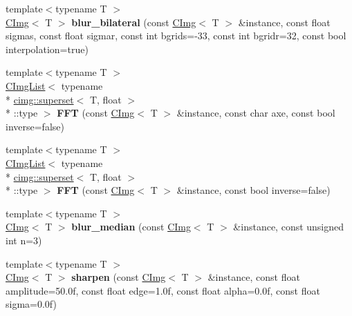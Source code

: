 \begin{DoxyCompactItemize}
\item 
\hypertarget{namespacecimg__library_a8e9e88613a50a5f8750eae25c4cb3ec2}{{\footnotesize template$<$typename T $>$ }\\\hyperlink{structcimg__library_1_1_c_img}{C\-Img}$<$ T $>$ {\bfseries blur\-\_\-bilateral} (const \hyperlink{structcimg__library_1_1_c_img}{C\-Img}$<$ T $>$ \&instance, const float sigmas, const float sigmar, const int bgrids=-\/33, const int bgridr=32, const bool interpolation=true)}\label{namespacecimg__library_a8e9e88613a50a5f8750eae25c4cb3ec2}

\item 
\hypertarget{namespacecimg__library_a1beefe187cc1e13f9b222b75ed6b1325}{{\footnotesize template$<$typename T $>$ }\\\hyperlink{structcimg__library_1_1_c_img_list}{C\-Img\-List}$<$ typename \\*
\hyperlink{structcimg__library_1_1cimg_1_1superset}{cimg\-::superset}$<$ T, float $>$\\*
\-::type $>$ {\bfseries F\-F\-T} (const \hyperlink{structcimg__library_1_1_c_img}{C\-Img}$<$ T $>$ \&instance, const char axe, const bool inverse=false)}\label{namespacecimg__library_a1beefe187cc1e13f9b222b75ed6b1325}

\item 
\hypertarget{namespacecimg__library_afba31aad9e0b94e3feaa49108a6f87c0}{{\footnotesize template$<$typename T $>$ }\\\hyperlink{structcimg__library_1_1_c_img_list}{C\-Img\-List}$<$ typename \\*
\hyperlink{structcimg__library_1_1cimg_1_1superset}{cimg\-::superset}$<$ T, float $>$\\*
\-::type $>$ {\bfseries F\-F\-T} (const \hyperlink{structcimg__library_1_1_c_img}{C\-Img}$<$ T $>$ \&instance, const bool inverse=false)}\label{namespacecimg__library_afba31aad9e0b94e3feaa49108a6f87c0}

\item 
\hypertarget{namespacecimg__library_ae79d8aaa5ec5fcb7ac289e66b2c82f64}{{\footnotesize template$<$typename T $>$ }\\\hyperlink{structcimg__library_1_1_c_img}{C\-Img}$<$ T $>$ {\bfseries blur\-\_\-median} (const \hyperlink{structcimg__library_1_1_c_img}{C\-Img}$<$ T $>$ \&instance, const unsigned int n=3)}\label{namespacecimg__library_ae79d8aaa5ec5fcb7ac289e66b2c82f64}

\item 
\hypertarget{namespacecimg__library_a5b954164f0326852fa782ae40c6c4bbd}{{\footnotesize template$<$typename T $>$ }\\\hyperlink{structcimg__library_1_1_c_img}{C\-Img}$<$ T $>$ {\bfseries sharpen} (const \hyperlink{structcimg__library_1_1_c_img}{C\-Img}$<$ T $>$ \&instance, const float amplitude=50.\-0f, const float edge=1.\-0f, const float alpha=0.\-0f, const float sigma=0.\-0f)}\label{namespacecimg__library_a5b954164f0326852fa782ae40c6c4bbd}


\end{DoxyCompactItemize}
